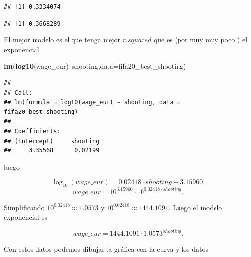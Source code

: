 \documentclass[]{article}
\newenvironment{Shaded}{\begin{snugshade}}{\end{snugshade}}
\newcommand{\CommentTok}[1]{\textcolor[rgb]{0.56,0.35,0.01}{\textit{#1}}}
\newcommand{\DataTypeTok}[1]{\textcolor[rgb]{0.13,0.29,0.53}{#1}}
\newcommand{\KeywordTok}[1]{\textcolor[rgb]{0.13,0.29,0.53}{\textbf{#1}}}
\newcommand{\NormalTok}[1]{#1}
\newcommand{\OperatorTok}[1]{\textcolor[rgb]{0.81,0.36,0.00}{\textbf{#1}}}
\begin{document}
\begin{verbatim}
## [1] 0.3334074
\end{verbatim}

\begin{Shaded}
\end{Shaded}

\begin{verbatim}
## [1] 0.3668289
\end{verbatim}

El mejor modelo es el que tenga mejor \(r.squared\) que es (por muy muy
poco ) el exponencial

\begin{Shaded}
\begin{Highlighting}[]
\KeywordTok{lm}\NormalTok{(}\KeywordTok{log10}\NormalTok{(wage_eur)}\OperatorTok{~}\NormalTok{shooting,}\DataTypeTok{data=}\NormalTok{fifa20_best_shooting)}
\end{Highlighting}
\end{Shaded}

\begin{verbatim}
## 
## Call:
## lm(formula = log10(wage_eur) ~ shooting, data = fifa20_best_shooting)
## 
## Coefficients:
## (Intercept)     shooting  
##     3.35568      0.02199
\end{verbatim}

luego

\[\log_{10}(wage\_eur)=  0.02418 \cdot shooting + 3.15960.\]
\[wage\_eur=  10^{3.15960}\cdot  10^{0.02418\cdot shooting}  .\]

Simplificando \(10^{0.02418}\approx1.0573\) y
\(10^{0.02418}\approx1444.1091\). Luego el modelo exponencial es

\[wage\_eur=  1444.1091\cdot 1.0573^{shooting}.\]

Con estos datos podemos dibujar la gráfica con la curva y los datos
\end{document}
